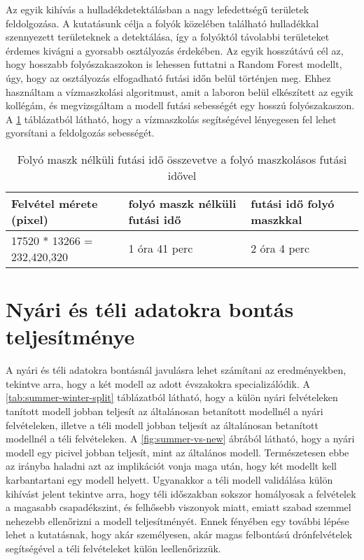 Az egyik kihívás a hulladékdetektálásban a nagy lefedettségű területek feldolgozása. A kutatásunk célja a folyók közelében található hulladékkal szennyezett területeknek a detektálása, így a folyóktól távolabbi területeket érdemes kivágni a gyorsabb osztályozás érdekében. Az egyik hosszútávú cél az, hogy hosszabb folyószakaszokon is lehessen futtatni a Random Forest modellt, úgy, hogy az osztályozás elfogadható futási időn belül történjen meg.
Ehhez használtam a vízmaszkolási algoritmust, amit a laboron belül elkészített az egyik kollégám, és megvizsgáltam a modell futási sebességét egy hosszú folyószakaszon. A \ref{tab:river-mask-performance} táblázatból látható, hogy a vízmaszkolás segítségével lényegesen fel lehet gyorsítani a feldolgozás sebességét.

\begin{table}[H]
	\centering
	\begin{tabular}{ | p{} | p{} | p{} | }
		\hline
		\textbf{Felvétel mérete (pixel)} & \textbf{folyó maszk nélküli futási idő} & \textbf{futási idő folyó maszkkal} \\
		\hline \hline
		 17520 * 13266 = 232,420,320 & 1 óra 41 perc & 2 óra 4 perc \\
		\hline
	\end{tabular}
	\caption{Folyó maszk nélküli futási idő összevetve a folyó maszkolásos futási idővel}
	\label{tab:river-mask-performance}
\end{table}

\section{Nyári és téli adatokra bontás teljesítménye}
\label{ch:summer-winter-models}

A nyári és téli adatokra bontásnál javulásra lehet számítani az eredményekben, tekintve arra, hogy a két modell az adott évszakokra specializálódik. A \ref{tab:summer-winter-split} táblázatból  látható, hogy a külön nyári felvételeken tanított modell jobban teljesít az általánosan betanított modellnél a nyári felvételeken, illetve a téli modell jobban teljesít az általánosan betanított modellnél a téli felvételeken. A \ref{fig:summer-vs-new} ábrából látható, hogy a nyári modell egy picivel jobban teljesít, mint az általános modell. Természetesen ebbe az irányba haladni azt az implikációt vonja maga után, hogy két modellt kell karbantartani egy modell helyett. Ugyanakkor a téli modell validálása külön kihívást jelent tekintve arra, hogy téli időszakban sokszor homályosak a felvételek a magasabb csapadékszint, és felhősebb viszonyok miatt, emiatt szabad szemmel nehezebb ellenőrizni a modell teljesítményét. Ennek fényében egy további lépése lehet a kutatásnak, hogy akár személyesen, akár magas felbontású drónfelvételek segítségével a téli felvételeket külön leellenőrizzük. 

